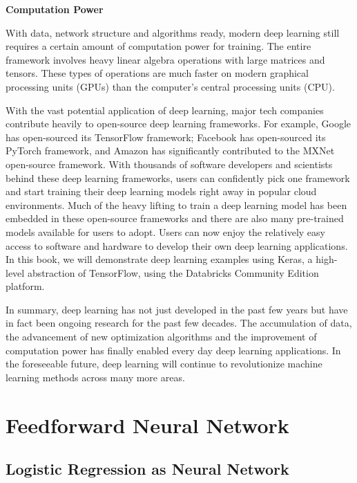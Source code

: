 \documentclass[
  12pt,
]{krantz}
\begin{document}
\textbf{Computation Power}

With data, network structure and algorithms ready, modern deep learning still requires a certain amount of computation power for training. The entire framework involves heavy linear algebra operations with large matrices and tensors. These types of operations are much faster on modern graphical processing units (GPUs) than the computer's central processing units (CPU).

With the vast potential application of deep learning, major tech companies contribute heavily to open-source deep learning frameworks. For example, Google has open-sourced its TensorFlow framework; Facebook has open-sourced its PyTorch framework, and Amazon has significantly contributed to the MXNet open-source framework. With thousands of software developers and scientists behind these deep learning frameworks, users can confidently pick one framework and start training their deep learning models right away in popular cloud environments. Much of the heavy lifting to train a deep learning model has been embedded in these open-source frameworks and there are also many pre-trained models available for users to adopt. Users can now enjoy the relatively easy access to software and hardware to develop their own deep learning applications. In this book, we will demonstrate deep learning examples using Keras, a high-level abstraction of TensorFlow, using the Databricks Community Edition platform.

In summary, deep learning has not just developed in the past few years but have in fact been ongoing research for the past few decades. The accumulation of data, the advancement of new optimization algorithms and the improvement of computation power has finally enabled every day deep learning applications. In the foreseeable future, deep learning will continue to revolutionize machine learning methods across many more areas.

\hypertarget{feedforward-neural-network}{%
\section{Feedforward Neural Network}\label{feedforward-neural-network}}

\hypertarget{logisticregasneuralnetwork}{%
\subsection{Logistic Regression as Neural Network}\label{logisticregasneuralnetwork}}
\end{document}
